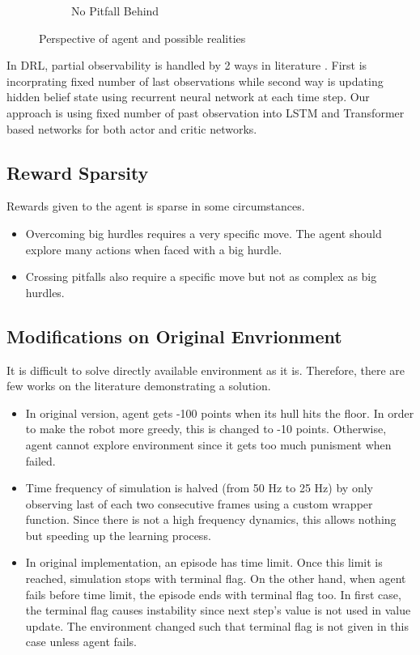 \begin{figure}
\begin{subfigure}{.32\textwidth}
		\caption{No Pitfall Behind}
		\label{fig:no_pitfall_behind}
	\end{subfigure}
	\caption{Perspective of agent and possible realities}
	\label{fig:partial_obs_pitfall}
\end{figure}
In DRL, partial observability is handled by 2 ways in literature \cite{dulac-arnold_challenges_2019}. First is incorprating fixed number of last observations while second way is updating hidden belief state using recurrent neural network at each time step. Our approach is using fixed number of past observation into LSTM and Transformer based networks for both actor and critic networks. \\
\subsection{Reward Sparsity}
Rewards given to the agent is sparse in some circumstances. 
\begin{itemize}
	\item Overcoming big hurdles requires a very specific move. The agent should explore many actions when faced with a big hurdle.
	\item Crossing pitfalls also require a specific move but not as complex as big hurdles.
\end{itemize}
\subsection{Modifications on Original Envrionment}
It is difficult to solve directly available environment as it is. Therefore, there are few works on the literature demonstrating a solution. 
\begin{itemize}
	\item In original version, agent gets -100 points when its hull hits the floor. In order to make the robot more greedy, this is changed to -10 points. Otherwise, agent cannot explore environment since it gets too much punisment when failed.
	\item Time frequency of simulation is halved (from 50 Hz to 25 Hz) by only observing last of each two consecutive frames using a custom wrapper function. Since there is not a high frequency dynamics, this allows nothing but speeding up the learning process.
	\item In original implementation, an episode has time limit. Once this limit is reached, simulation stops with terminal flag. On the other hand, when agent fails before time limit, the episode ends with terminal flag too. In first case, the terminal flag causes instability since next step's value is not used in value update. The environment changed such that terminal flag is not given in this case unless agent fails.
\end{itemize}
